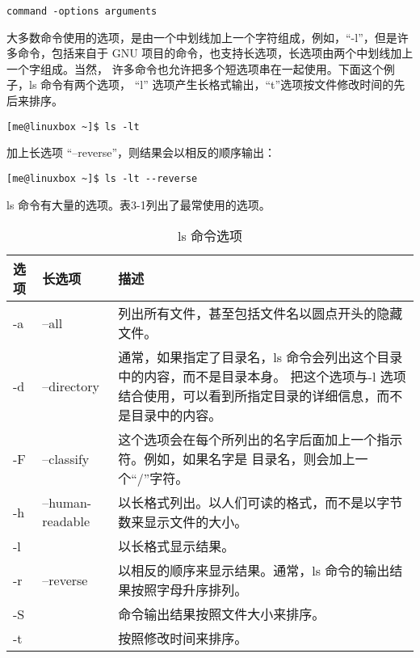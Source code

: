 \begin{lstlisting}
command -options arguments
\end{lstlisting}

\par 大多数命令使用的选项，是由一个中划线加上一个字符组成，例如，“-l”，但是许多命令，包括来自于 GNU 项目的命令，也支持长选项，长选项由两个中划线加上一个字组成。当然， 许多命令也允许把多个短选项串在一起使用。下面这个例子，ls 命令有两个选项， “l” 选项产生长格式输出，“t”选项按文件修改时间的先后来排序。

\begin{lstlisting}
[me@linuxbox ~]$ ls -lt
\end{lstlisting}

\par 加上长选项 “–reverse”，则结果会以相反的顺序输出：

\begin{lstlisting}
[me@linuxbox ~]$ ls -lt --reverse
\end{lstlisting}

\par ls 命令有大量的选项。表3-1列出了最常使用的选项。

\begin{table}[ht!]
\caption{ls 命令选项}
\label{table2}
\centering
\begin{tabular}{p{1.5cm}p{3.5cm}p{10cm}}
\hline
 选项 & 长选项 & 描述 \\
\hline
 -a & --all & 列出所有文件，甚至包括文件名以圆点开头的隐藏文件。 \\
-d & --directory & 通常，如果指定了目录名，ls 命令会列出这个目录中的内容，而不是目录本身。 把这个选项与-l 选项结合使用，可以看到所指定目录的详细信息，而不是目录中的内容。\\
-F & --classify	& 这个选项会在每个所列出的名字后面加上一个指示符。例如，如果名字是 目录名，则会加上一个``/''字符。 \\
-h & --human-readable & 以长格式列出。以人们可读的格式，而不是以字节数来显示文件的大小。\\
-l & & 以长格式显示结果。\\
-r & --reverse & 以相反的顺序来显示结果。通常，ls 命令的输出结果按照字母升序排列。 \\
-S & & 命令输出结果按照文件大小来排序。\\
-t & & 按照修改时间来排序。\\
\hline
\end{tabular}
\end{table}


